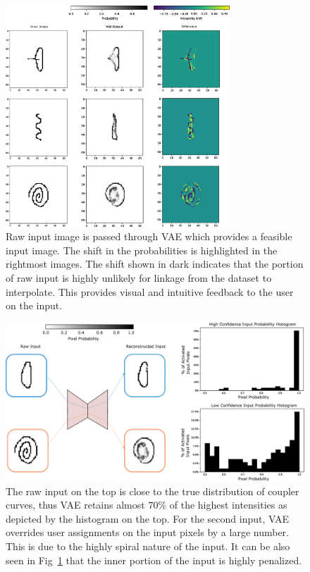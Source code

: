 \begin{figure}
\centering
\includegraphics[width=0.75\textwidth]{idetc-20/figure/probability_shift.eps}
  \caption{Raw input image is passed through VAE which provides a feasible input image. The shift in the probabilities is highlighted in the rightmost images. The shift shown in dark indicates that the portion of raw input is highly unlikely for linkage from the dataset to interpolate. This provides visual and intuitive feedback to the user on the input.}
\label{fig_prob_shift_effect}
\end{figure}

\begin{figure}
\centering
\includegraphics[width=\textwidth]{idetc-20/figure/high_low_confidence_feedback_new.eps}
  \caption{The raw input on the top is close to the true distribution of coupler curves, thus VAE retains almost $70\%$ of the highest intensities as depicted by the histogram on the top. For the second input, VAE overrides user assignments on the input pixels by a large number. This is due to the highly spiral nature of the input. It can be also seen in Fig~\ref{fig_prob_shift_effect} that the inner portion of the input is highly penalized. }
\label{fig_two_inputs}
\end{figure}


